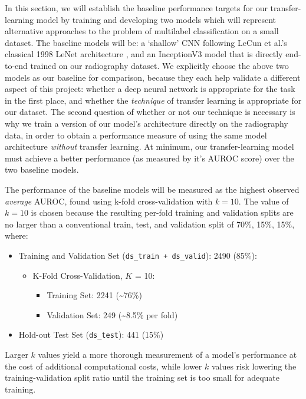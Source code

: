 In this section, we will establish the baseline performance targets for our transfer-learning model by training and developing two models which will represent alternative approaches to the problem of multilabel classification on a small dataset. The baseline models will be: a \enquote*{shallow} CNN following LeCun et al.'s classical 1998 LeNet architecture \autocite{lenet1998}, and an InceptionV3 model that is directly end-to-end trained on our radiography dataset. We explicitly choose the above two models as our baseline for comparison, because they each help validate a different aspect of this project: whether a deep neural network is appropriate for the task in the first place, and whether the \emph{technique} of transfer learning is appropriate for our dataset. The second question of whether or not our technique is necessary is why we train a version of our model's architecture directly on the radiography data, in order to obtain a performance measure of using the same model architecture \emph{without} transfer learning. At minimum, our transfer-learning model must achieve a better performance (as measured by it's AUROC score) over the two baseline models.

The performance of the baseline models will be measured as the highest observed \emph{average} AUROC, found using k-fold cross-validation with \(k=10\). The value of \(k=10\) is chosen because the resulting per-fold training and validation splits are no larger than a conventional train, test, and validation split of 70\%, 15\%, 15\%, where:

\begin{itemize}
    \item Training and Validation Set (\texttt{ds\_train + ds\_valid}): 2490 (85\%):
    \begin{itemize}
        \item K-Fold Cross-Validation, $K$ = 10:
        \begin{itemize}
            \item Training Set: 2241 (\textasciitilde76\%)
            \item Validation Set: 249 (\textasciitilde8.5\% per fold)
        \end{itemize}
    \end{itemize}
    \item Hold-out Test Set (\texttt{ds\_test}): 441 (15\%)
\end{itemize}

\noindent
Larger \(k\) values yield a more thorough measurement of a model's performance at the cost of additional computational costs, while lower \(k\) values risk lowering the training-validation split ratio until the training set is too small for adequate training.

